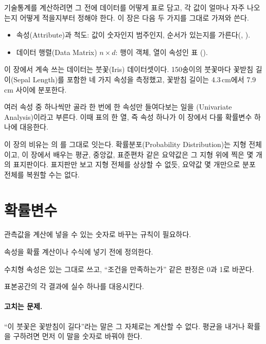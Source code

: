 기술통계를 계산하려면 그 전에 데이터를 어떻게 표로 담고, 각 값이 얼마나
자주 나오는지 어떻게 적을지부터 정해야 한다. 이 장은 다음 두 가지를
그대로 가져와 쓴다.

\begin{itemize}
  \item 속성(Attribute)과 척도: 값이 숫자인지 범주인지, 순서가 있는지를
        가른다(, ).
  \item 데이터 행렬(Data Matrix) $n \times d$: 행이 객체, 열이 속성인 표
        ().
\end{itemize}

이 장에서 계속 쓰는 데이터는 붓꽃(Iris) 데이터셋이다. 150송이의 붓꽃마다
꽃받침 길이(Sepal Length)를 포함한 네 가지 속성을 측정했고, 꽃받침
길이는 4.3\,cm에서 7.9\,cm 사이에 분포한다.

여러 속성 중 하나씩만 골라 한 번에 한 속성만 들여다보는 일을
(Univariate Analysis)이라고 부른다.
이때 표의 한 열, 즉 속성 하나가 이 장에서 다룰 확률변수 하나에
대응한다.

이 장의 비유는 의 를 그대로 잇는다.
확률분포(Probability Distribution)는 지형 전체이고, 이 장에서 배우는
평균, 중앙값, 표준편차 같은 요약값은 그 지형 위에 찍은 몇 개의 표지판이다.
표지판만 보고 지형 전체를 상상할 수 없듯, 요약값 몇 개만으로 분포
전체를 복원할 수는 없다.

\section{확률변수}
\label{sec:random-variable}

\begin{inbrief}
  \item[Why] 관측값을 계산에 넣을 수 있는 숫자로 바꾸는 규칙이 필요하다.
  \item[When] 속성을 확률 계산이나 수식에 넣기 전에 정의한다.
  \item[Where] 수치형 속성은 있는 그대로 쓰고, ``조건을 만족하는가''
               같은 판정은 0과 1로 바꾼다.
  \item[How] 표본공간의 각 결과에 실수 하나를 대응시킨다.
\end{inbrief}

\paragraph{고치는 문제.} ``이 붓꽃은 꽃받침이 길다''라는 말은 그 자체로는
계산할 수 없다. 평균을 내거나 확률을 구하려면 먼저 이 말을 숫자로 바꿔야
한다.

